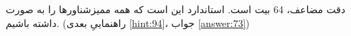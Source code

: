 \section{}
\paragraph{}\label{hint:57}
دقت مضاعف، 64 بیت است. استاندارد  این است که همه ممیزشناورها را به صورت  داشته باشیم. (راهنماییِ بعدی \ref{hint:94}، جواب \ref{answer:73})